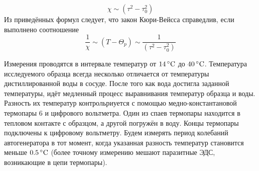 \documentclass[12pt]{article}
\begin{document}
\[
	\chi \sim \left(\tau^2 - \tau_0^2\right)
\]
Из приведённых формул следует, что закон Кюри-Вейсса справедлив, если выполнено соотношение
\[
	\frac{1}{\chi} \sim \left(T - \Theta_p\right) \sim \frac{1}{\left(\tau^2 - \tau_0^2 \right)}
\]
\par
	Измерения проводятся в интервале температур от $14 \, \degree \text{C}$ до $40 \, \degree \text{C}$. Температура исследуемого образца всегда несколько отличается от температуры дистиллированной воды в сосуде. После того как вода достигла заданной температуры, идёт медленный процесс выравнивания температур образца и воды. Разность их температур контрольриуется с помощью медно-константановой термопары 6 и цифрового вольтметра. Один из спаев термопары находится в тепловом контакте с образцом, а другой погружён в воду. Концы термопары подключены к цифровому вольтметру. Будем измерять период колебаний автогенератора в тот момент, когда указанная разность температур становится меньше $0.5 \, \degree \text{C}$ (более точному измерению мешают паразитные ЭДС, возникающие в цепи термопары).
	
\end{document}
